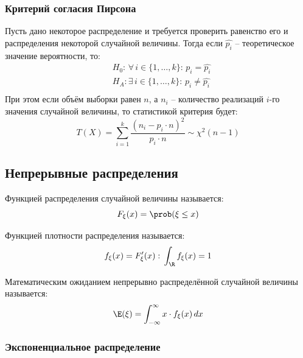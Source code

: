\documentclass[12pt]{article}
\begin{document}
\subsubsection{Критерий согласия Пирсона}

\begin{statement}
    Пусть дано некоторое распределение и требуется проверить равенство его и распределения некоторой случайной величины. Тогда если $\hat{p_i}$ – теоретическое значение вероятности, то:
    \begin{align*}
        &H_0:\, \forall\, i\in\{1,\ldots,k\}:\,p_i=\hat{p_i}\\
        &H_A: \exists\, i\in\{1,\ldots,k\}:\,p_i\neq\hat{p_i}\\
    \end{align*}
    При этом если объём выборки равен $n$, а $n_i$ – количество реализаций $i$-го значения случайной величины, то статистикой критерия будет:
    $$T(X)=\sum_{i=1}^{k}\frac{(n_i-p_i\cdot n)^2}{p_i\cdot n}\sim \chi^2(n-1)$$
\end{statement}

\subsection{Непрерывные распределения}

\begin{definition}
    Функцией распределения случайной величины называется:
    $$F_\xi(x)=\prob(\xi\leq x)$$
\end{definition}
\begin{definition}
    Функцией плотности распределения называется:
    $$f_\xi(x)=F_\xi'(x):\,\int_{\R}f_\xi(x)=1$$
\end{definition}
\begin{definition}
    Математическим ожиданием непрерывно распределённой случайной величины называется:
    $$\E(\xi)=\int_{-\infty}^{\infty}x\cdot f_\xi(x)\,d x$$
\end{definition}

\subsubsection{Экспоненциальное распределение}
\end{document}
